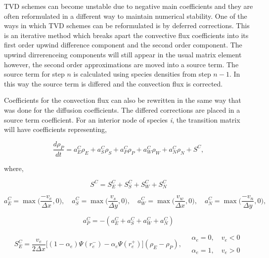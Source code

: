 TVD schemes can become unstable due to negative main coefficients and they are often reformulated in a different way to maintain numerical stability. One of the ways in which TVD schemes can be reformulated is by deferred corrections. This is an iterative method which breaks apart the convective flux coefficients into its first order upwind difference component and the second order component. The upwind dirrerenceing components will still appear in the usual matrix element however, the second order approximations are moved into a source term. The source term for step $n$ is calculated using species densities from step $n-1$. In this way the source term is differed and the convection flux is corrected.  

Coefficients for the convection flux can also be rewritten in the same way that was done for the diffusion coefficients. The differed corrections are placed in a source term coefficient. For an interior node of species \textit{i}, the transition matrix will have coefficients representing,

\begin{equation}
    \frac{d \rho_{P}}{dt} = a^{C}_{E}\rho_{E} + a^{C}_{S}\rho_{S} + a^{C}_{P}\rho_{P} + a^{C}_{W}\rho_{W} + a^{C}_{N}\rho_{N} + S^{C},
\end{equation}

\noindent where,

\begin{equation*}
    S^{C} = S_{E}^{C} + S_{S}^{C} + S_{W}^{C} + S_{N}^{C}
\end{equation*}

\begin{equation*}
    a^{C}_{E} = \max\bigg(\frac{-v_{e}}{\Delta x}, 0\bigg), \quad 
    a^{C}_{S} = \max\bigg(\frac{v_{s}}{\Delta y}, 0\bigg), \quad 
    a^{C}_{W} = \max\bigg(\frac{v_{w}}{\Delta x}, 0\bigg), \quad
    a^{C}_{N} = \max\bigg(\frac{-v_{n}}{\Delta y}, 0\bigg), \quad 
\end{equation*}

\begin{equation*}
    a_{P}^{C} = -(a_{E}^{C} + a_{S}^{C} + a_{W}^{C} + a_{N}^{C})
\end{equation*}

\begin{equation*}
    S^{C}_{E} = \frac{v_{e}}{2\Delta x}\bigg[(1-\alpha_{e})\Psi(r_{e}^{-}) - \alpha_{e}\Psi(r_{e}^{+})\bigg](\rho_{E} - \rho_{P}), \quad \substack{\alpha_{e} = 0, \quad v_{e} < 0\\
    \\
    \alpha_{e} = 1, \quad v_{e} > 0}
\end{equation*}

